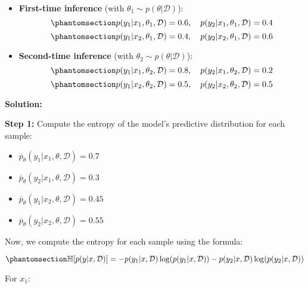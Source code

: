 \documentclass[
  letterpaper,
  numbers=noenddot,
  DIV=11]{scrreprt}
\providecommand{\tightlist}{%
  \setlength{\itemsep}{0pt}\setlength{\parskip}{0pt}}\usepackage{longtable,booktabs,array}
\theoremstyle{definition}
\theoremstyle{plain}
\theoremstyle{plain}
\theoremstyle{remark}
\begin{document}
\begin{itemize}
\item
  \textbf{First-time inference} (with
  \(\theta_1 \sim p(\theta | \mathcal{D})\)):
  \begin{equation}\phantomsection\label{eq-eq3.5}{
  p(y_1|x_1, \theta_1, \mathcal{D}) = 0.6, \quad p(y_2|x_1, \theta_1, \mathcal{D}) = 0.4
  }\end{equation} \begin{equation}\phantomsection\label{eq-eq3.6}{
  p(y_1|x_2, \theta_1, \mathcal{D}) = 0.4, \quad p(y_2|x_2, \theta_1, \mathcal{D}) = 0.6
  }\end{equation}
\item
  \textbf{Second-time inference} (with
  \(\theta_2 \sim p(\theta | \mathcal{D})\)):
  \begin{equation}\phantomsection\label{eq-eq3.7}{
  p(y_1|x_1, \theta_2, \mathcal{D}) = 0.8, \quad p(y_2|x_1, \theta_2, \mathcal{D}) = 0.2
  }\end{equation} \begin{equation}\phantomsection\label{eq-eq3.8}{
  p(y_1|x_2, \theta_2, \mathcal{D}) = 0.5, \quad p(y_2|x_2, \theta_2, \mathcal{D}) = 0.5
  }\end{equation}
\end{itemize}

\textbf{Solution:}

\textbf{Step 1:} Compute the entropy of the model's predictive
distribution for each sample:

\begin{itemize}
\tightlist
\item
  \(\overline{p}_{\theta}(y_1|x_1, \theta, \mathcal{D}) = 0.7\)
\item
  \(\overline{p}_{\theta}(y_2|x_1, \theta, \mathcal{D}) = 0.3\)
\item
  \(\overline{p}_{\theta}(y_1|x_2, \theta, \mathcal{D}) = 0.45\)
\item
  \(\overline{p}_{\theta}(y_2|x_2, \theta, \mathcal{D}) = 0.55\)
\end{itemize}

Now, we compute the entropy for each sample using the formula:

\begin{equation}\phantomsection\label{eq-eq3.9}{
\mathbb{H}[p(y|x, \mathcal{D})] = - p(y_1|x, \mathcal{D}) \log(p(y_1|x, \mathcal{D})) - p(y_2|x, \mathcal{D}) \log(p(y_2|x, \mathcal{D}))
}\end{equation}

For \(x_1\):
\end{document}
